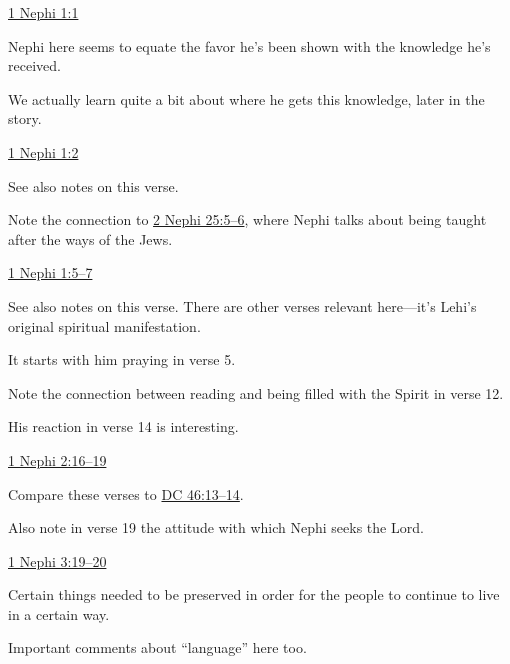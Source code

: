 		\begin{compactdesc}
			\item[{\hyperref[1NEPHI-1-1]{1 Nephi 1:1}}] \phantom{.}
				\begin{compactitem}
					\item Nephi here seems to equate the favor he's been shown with the knowledge he's received.
					\item We actually learn quite a bit about where he gets this knowledge, later in the story.
				\end{compactitem}
			\item[{\hyperref[1NEPHI-1-2]{1 Nephi 1:2}}] \phantom{.}
				\begin{compactitem}
					\item See also notes on this verse.
					\item Note the connection to \hyperref[2NEPHI-25-5]{2 Nephi 25:5--6}, where Nephi talks about being taught after the ways of the Jews.
				\end{compactitem}
			\item[{\hyperref[1NEPHI-1-5]{1 Nephi 1:5--7}}] \phantom{.}
				\begin{compactitem}
					\item See also notes on this verse. There are other verses relevant here---it's Lehi's original spiritual manifestation.
					\item It starts with him praying in verse 5.
					\item Note the connection between reading and being filled with the Spirit in verse 12.
					\item His reaction in verse 14 is interesting.
				\end{compactitem}
			\item[{\hyperref[1NEPHI-2-16]{1 Nephi 2:16--19}}] \phantom{.}
				\begin{compactitem}
					\item Compare these verses to \hyperref[DC46-13]{DC 46:13--14}.
					\item Also note in verse 19 the attitude with which Nephi seeks the Lord.
				\end{compactitem}
			\item[{\hyperref[1NEPHI-3-19]{1 Nephi 3:19--20}}] \phantom{.}
				\begin{compactitem}
					\item Certain things needed to be preserved in order for the people to continue to live in a certain way.
					\item Important comments about ``language'' here too.

\end{compactitem}
\end{compactdesc}

